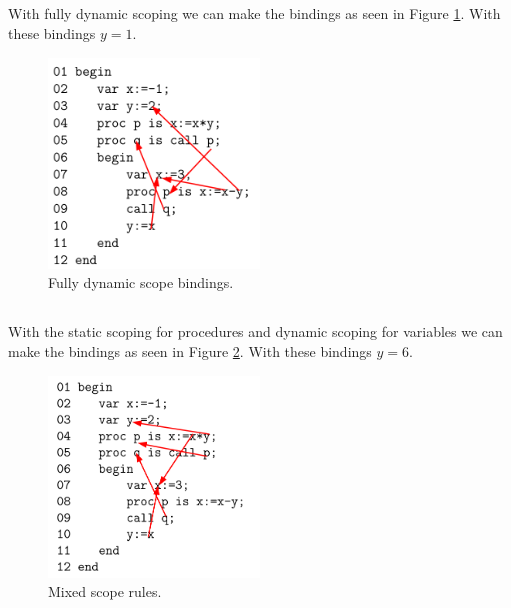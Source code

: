 \documentclass[12pt]{article}
\begin{document}
\subsection{}
With fully dynamic scoping we can make the bindings as seen in Figure \ref{fig:dynamic}. With these bindings $y=1$.

\begin{figure}[h!]
        \centering
        \includegraphics[width=0.5\textwidth]{dynamic.png}
        \caption{Fully dynamic scope bindings.}
        \label{fig:dynamic}
\end{figure}

\subsection{}
With the static scoping for procedures and dynamic scoping for variables we can make the bindings as seen in Figure \ref{fig:mixed}. With these bindings $y=6$.

\begin{figure}[h!]
        \centering
        \includegraphics[width=0.5\textwidth]{mixed.png}
        \caption{Mixed scope rules.}
        \label{fig:mixed}
\end{figure}
\end{document}
